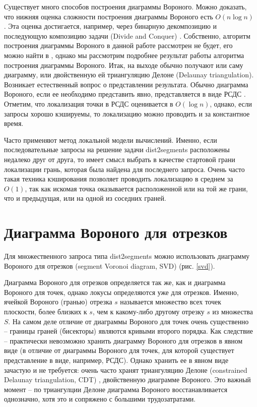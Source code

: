 Существует много способов построения диаграммы Вороного. Можно
доказать, что нижняя оценка сложности построения диаграммы Вороного есть
$O(n \log n)$. Эта оценка достигается, например, через бинарную декомпозицию и
последующую композицию задачи (Divide and Conquer) \cite{PrSh}. Собственно, алгоритм
построения диаграммы Вороного в данной работе рассмотрен не будет, его
можно найти в \cite{PrSh, CGAL}, однако мы рассмотрим подробнее результат работы
алгоритма построения диаграммы Вороного. Итак, на выходе обычно получают
или саму диаграмму, или двойственную ей триангуляцию Делоне (Delaunay
triangulation). Возникает естественный вопрос о представлении результата.
Обычно диаграмма Вороного, если ее необходимо представить явно,
представляется в виде РСДС \cite{PrSh}. Отметим, что локализация точки в РСДС
оценивается в $O(\log n)$, однако, если запросы хорошо кэшируемы, то
локализацию можно проводить и за константное время.

Часто применяют метод локальной модели вычислений. Именно, если
последовательные запросы на решение задачи dist2segments расположены недалеко
друг от друга, то имеет смысл выбрать в качестве стартовой грани локализации
грань, которая была найдена для последнего запроса. Очень часто такая
техника кэширования позволяет проводить локализацию в среднем за $O(1)$, так как
искомая точка оказывается расположенной или на той же грани, что и
предыдущая, или на одной из соседних граней.

\FloatBarrier
\section{Диаграмма Вороного для отрезков}

Для множественного запроса типа dist2segments можно использовать
диаграмму Вороного для отрезков (segment Voronoi diagram, SVD) \cite{SVD} (рис. \ref{svd}).


Диаграмма Вороного для отрезков определяется так же, как и диаграмма
Вороного для точек, однако локусы определяются уже для отрезков. Именно,
ячейкой Вороного (гранью) отрезка $s$ называется множество всех точек
плоскости, более близких к $s$, чем к какому-либо другому отрезку $s$ из
множества $S$. На самом деле отличие от диаграммы Вороного для точек очень
существенно -- границы граней (бисекторы) являются кривыми второго
порядка. Как следствие -- практически невозможно хранить диаграмму Вороного
для отрезков в явном виде (в отличие от диаграммы Вороного для точек, для которой существует
представление в виде, например, РСДС).
Однако хранить ее в явном виде зачастую и не требуется: очень часто
хранят триангуляцию Делоне (constrained Delaunay
triangulation, CDT) \cite{CGAL}, двойственную диаграмме Вороного. Это важный момент -- 
по триангулции Делоне диаграмма Вороного восстанавливается
однозначно, хотя это и сопряжено с большими трудозатратами.

